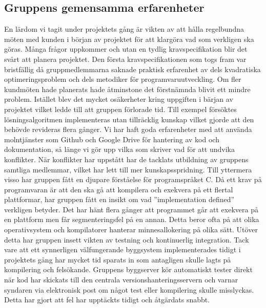 \subsection{Gruppens gemensamma erfarenheter}
En lärdom vi tagit under projektets gång är vikten av att hålla regelbundna möten med kunden i början av projektet för att klargöra vad som verkligen ska göras. Många frågor uppkommer och utan en tydlig kravspecifikation blir det svårt att planera projektet. Den första kravspecifikationen som togs fram var bristfällig då gruppmedlemmarna saknade praktisk erfarenhet av dels kvadratiska optimeringsproblem och dels metodiker för programvaruutveckling. Om fler kundmöten hade planerats hade åtminstone det förstnämnda blivit ett mindre problem. Istället blev det mycket osäkerheter kring uppgiften i bärjan av projektet vilket ledde till att gruppen förlorade tid. Till exempel försöktes lösningsalgoritmen implementeras utan tillräcklig kunskap vilket gjorde att den behövde revideras flera gånger.
\newline
\newline
Vi har haft goda erfarenheter med att använda molntjänster som Github och Google Drive för hantering av kod och dokumentation, så länge vi gör upp vilka som skriver vad för att undvika konflikter. När konflikter har uppstått har de tacklats utbildning av gruppens samtliga medlemmar, vilket har lett till mer kunskapsspridning.
\newline
\newline
Till yttermera visso har gruppen fått en djupare förståelse för programspråket C. Då ett krav på programvaran är att den ska gå att kompilera och exekvera på ett flertal plattformar, har gruppen fått en insikt om vad ''implementation defined'' verkligen betyder. Det har hänt flera gånger att programmet går att exekvera på en plattform men får segmenteringsfel på en annan. Detta beror ofta på att olika operativsystem och kompilatorer hanterar minnesallokering på olika sätt.
\newline
\newline
Utöver detta har gruppen insett vikten av testning och kontinuerlig integration. Tack vare att ett synnerligen välfungerande byggsystem implementerades tidigt i projektets gång har mycket tid sparats in som antagligen skulle lagts på kompilering och felsökande. Gruppens byggserver kör automatiskt tester direkt när kod har skickats till den centrala versionshanteringsservern och varnar syndaren via elektronisk post om något test eller kompilering skulle misslyckas. Detta har gjort att fel har upptäckts tidigt och åtgärdats snabbt.

